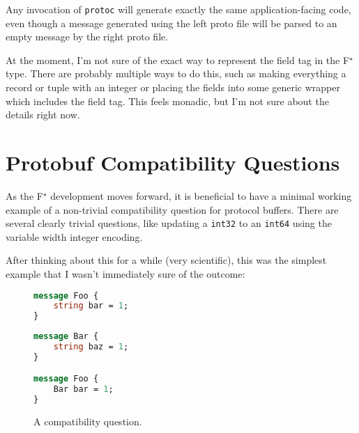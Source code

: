 \documentclass[11pt]{article}
\newcommand{\fstar}{F\(^\star\)}
\begin{document}
Any invocation of \texttt{protoc} will generate exactly the same
application-facing code, even though a message generated using the left proto
file will be parsed to an empty message by the right proto file.

At the moment, I'm not sure of the exact way to represent the field tag in the
\fstar{} type. There are probably multiple ways to do this, such as making
everything a record or tuple with an integer or placing the fields into some
generic wrapper which includes the field tag. This feels monadic, but I'm not
sure about the details right now.

\section{Protobuf Compatibility Questions}

As the \fstar{} development moves forward, it is beneficial to have a minimal
working example of a non-trivial compatibility question for protocol
buffers. There are several clearly trivial questions, like updating a
\texttt{int32} to an \texttt{int64} using the variable width integer encoding.

After thinking about this for a while (very scientific), this was the simplest
example that I wasn't immediately sure of the outcome:

\begin{figure}[H]
	\centering
	\begin{minipage}[bt]{0.4\textwidth}
		\begin{lstlisting}[language=proto]
message Foo {
    string bar = 1;
}\end{lstlisting}
	\end{minipage}
	\hspace{1cm}
	\begin{minipage}[bt]{0.4\textwidth}
		\begin{lstlisting}[language=proto]
message Bar {
    string baz = 1;
}

message Foo {
    Bar bar = 1;
}\end{lstlisting}
	\end{minipage}

	\caption[]{A compatibility question.}
\end{figure}

\printbibliography{}
\end{document}
